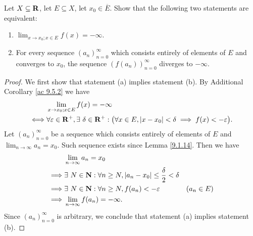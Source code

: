 \begin{additional corollary}\label{ac 9.5.4}
Let \(X \subseteq \mathbf{R}\), let \(E \subseteq X\), let \(x_0 \in \overline{E}\).
Show that the following two statements are equivalent:
\begin{enumerate}
    \item \(\lim_{x \to x_0 ; x \in E} f(x) = -\infty\).
    \item For every sequence \((a_n)_{n = 0}^\infty\) which consists entirely of elements of \(E\) and converges to \(x_0\), the sequence \((f(a_n))_{n = 0}^\infty\) diverges to \(-\infty\).
\end{enumerate}
\end{additional corollary}

\begin{proof}
    We first show that statement (a) implies statement (b).
    By Additional Corollary \ref{ac 9.5.2} we have
    \begin{align*}
             & \lim_{x \to x_0 ; x \in E} f(x) = -\infty                                                                                                \\
        \iff & \forall \varepsilon \in \mathbf{R}^+, \exists\ \delta \in \mathbf{R}^+ : \big(\forall x \in E, \left\lvert x - x_0\right\rvert < \delta \implies f(x) < -\varepsilon\big).
    \end{align*}
    Let \((a_n)_{n = 0}^\infty\) be a sequence which consists entirely of elements of \(E\) and \(\lim_{n \to \infty} a_n = x_0\).
    Such sequence exists since Lemma \ref{9.1.14}.
    Then we have
    \begin{align*}
                 & \lim_{n \to \infty} a_n = x_0                                                                      \\
        \implies & \exists\ N \in \mathbf{N} : \forall n \geq N, \left\lvert a_n - x_0\right\rvert \leq \frac{\delta}{2} < \delta               \\
        \implies & \exists\ N \in \mathbf{N} : \forall n \geq N, f(a_n) < -\varepsilon                          & (a_n \in E) \\
        \implies & \lim_{n \to \infty} f(a_n) = -\infty.
    \end{align*}
    Since \((a_n)_{n = 0}^\infty\) is arbitrary, we conclude that statement (a) implies statement (b).


\end{proof}
